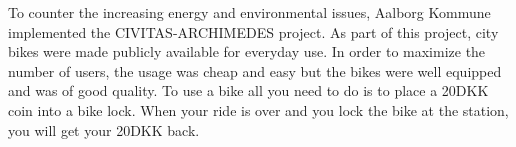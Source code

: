 To counter the increasing energy and environmental issues, Aalborg Kommune implemented the CIVITAS-ARCHIMEDES project\cite{aalborgbycyklenbagcyklen}. As part of this project, city bikes were made publicly available for everyday use.
In order to maximize the number of users, the usage was cheap and easy but the bikes were well equipped and was of good quality\cite{cykelplanlaegning}.
To use a bike all you need to do is to place a 20DKK coin into a bike lock. When your ride is over and you lock the bike at the station, you will get your 20DKK back.